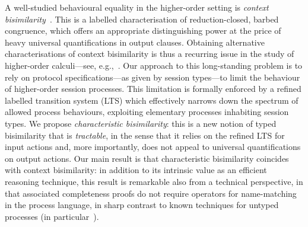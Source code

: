 
A well-studied behavioural equality in the higher-order setting 
is \emph{context bisimilarity}~\cite{San96H}. This is 
a labelled characterisation of reduction-closed, barbed congruence, 
which offers an appropriate distinguishing power at the price of heavy universal quantifications in output clauses.
Obtaining alternative characterisations of context bisimilarity
is thus a recurring issue 
in the study of higher-order calculi---see, e.g.,~\cite{SangiorgiD:expmpa,San96H,JeffreyR05,DBLP:journals/cl/KoutavasH12}. 
Our approach 
to this long-standing problem is to 
rely on protocol specifications---as given by session types---to limit 
the behaviour of higher-order session processes. 
This limitation is formally enforced by 
a refined labelled transition system (LTS)
which effectively 
narrows down the spectrum of allowed process behaviours, 
exploiting elementary processes inhabiting session types.
We propose \emph{characteristic bisimilarity}: this is 
a new notion of typed bisimilarity that is 
\emph{tractable}, in the sense that 
it relies on the refined LTS for input actions and, more importantly, 
does not appeal to universal quantifications on output actions. 
Our main result is that characteristic  %
bisimilarity coincides with context bisimilarity:
in addition to its intrinsic value as an efficient reasoning technique, this result is remarkable 
also from a technical perspective, in that associated 
completeness proofs do not require 
operators for 
name-matching in the process language, in sharp contrast to known techniques for untyped processes (in particular~\cite{JeffreyR05}).



